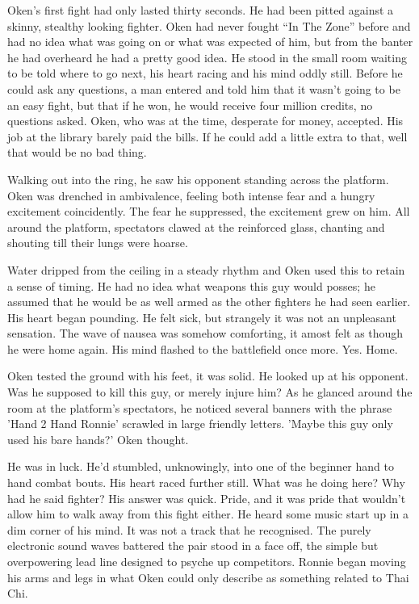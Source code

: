 \thoughtbreak

Oken's first fight had only lasted thirty seconds. He had been pitted against a skinny, stealthy looking fighter. Oken had never fought ``In The Zone'' before and had no idea what was going on or what was expected of him, but from the banter he had overheard he had a pretty good idea. He stood in the small room waiting to be told where to go next, his heart racing and his mind oddly still. Before he could ask any questions, a man entered and told him that it wasn't going to be an easy fight, but that if he won, he would receive four million credits, no questions asked. Oken, who was at the time, desperate for money, accepted. His job at the library barely paid the bills. If he could add a little extra to that, well that would be no bad thing.

Walking out into the ring, he saw his opponent standing across the platform. Oken was drenched in ambivalence, feeling both intense fear and a hungry excitement coincidently. The fear he suppressed, the excitement grew on him. All around the platform, spectators clawed at the reinforced glass, chanting and shouting till their lungs were hoarse.

Water dripped from the ceiling in a steady rhythm and Oken used this to retain a sense of timing. He had no idea what weapons this guy would posses; he assumed that he would be as well armed as the other fighters he had seen earlier. His heart began pounding. He felt sick, but strangely it was not an unpleasant sensation. The wave of nausea was somehow comforting, it amost felt as though he were home again. His mind flashed to the battlefield once more. Yes. Home.

 Oken tested the ground with his feet, it was solid. He looked up at his opponent. Was he supposed to kill this guy, or merely injure him? As he glanced around the room at the platform's spectators, he noticed several banners with the phrase 'Hand 2 Hand Ronnie' scrawled in large friendly letters. 'Maybe this guy only used his bare hands?' Oken thought.

He was in luck. He'd stumbled, unknowingly, into one of the beginner hand to hand combat bouts. His heart raced further still. What was he doing here? Why had he said fighter? His answer was quick. Pride, and it was pride that wouldn't allow him to walk away from this fight either. He heard some music start up in a dim corner of his mind. It was not a track that he recognised. The purely electronic sound waves battered the pair stood in a face off, the simple but overpowering lead line designed to psyche up competitors. Ronnie began moving his arms and legs in what Oken could only describe as something related to Thai Chi.

